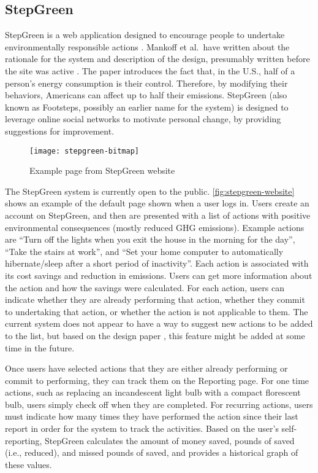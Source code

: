 \subsection{StepGreen}
\label{sec:stepgreen}

StepGreen is a web application designed to encourage people to undertake environmentally responsible actions \cite{step-green-website}. Mankoff et al.\ have written about the rationale for the system and description of the design, presumably written before the site was active \cite{Mankoff2007Leveraging-Soci}. The paper introduces the fact that, in the U.S., half of a person's energy consumption is their control. Therefore, by modifying their behaviors, Americans can affect up to half their \COtwo emissions. StepGreen (also known as Footsteps, possibly an earlier name for the system) is designed to leverage online social networks to motivate personal change, by providing suggestions for improvement.

\begin{figure}[htbp]
	\centering
		\texttt{[image: stepgreen-bitmap]}
		\caption{Example page from StepGreen website}
		\label{fig:stepgreen-website}
\end{figure}

The StepGreen system is currently open to the public. \autoref{fig:stepgreen-website} shows an example of the default page shown when a user logs in. Users create an account on StepGreen, and then are presented with a list of actions with positive environmental consequences (mostly reduced GHG emissions). Example actions are ``Turn off the lights when you exit the house in the morning for the day'', ``Take the stairs at work'', and ``Set your home computer to automatically hibernate/sleep after a short period of inactivity''. Each action is associated with its cost savings and reduction in \COtwo emissions. Users can get more information about the action and how the savings were calculated. For each action, users can indicate whether they are already performing that action, whether they commit to undertaking that action, or whether the action is not applicable to them. The current system does not appear to have a way to suggest new actions to be added to the list, but based on the design paper \cite{Mankoff2007Leveraging-Soci}, this feature might be added at some time in the future.

Once users have selected actions that they are either already performing or commit to performing, they can track them on the Reporting page. For one time actions, such as replacing an incandescent light bulb with a compact florescent bulb, users simply check off when they are completed. For recurring actions, users must indicate how many times they have performed the action since their last report in order for the system to track the activities. Based on the user's self-reporting, StepGreen calculates the amount of money saved, pounds of \COtwo saved (i.e., reduced), and missed pounds of \COtwo saved, and provides a historical graph of these values.

